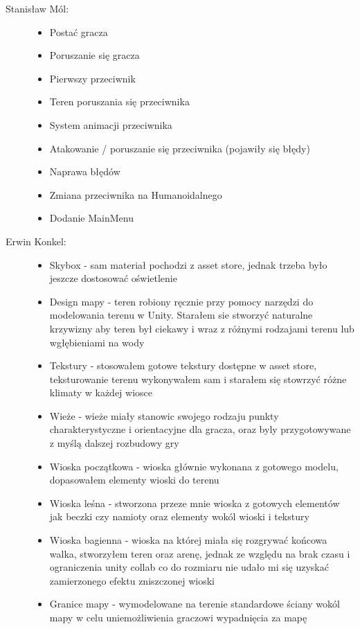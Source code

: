 \documentclass[10pt,a4paper]{article}
\begin{document}
\vspace{0.5cm}
\begin{description}
  \item[Stanisław Mól:] \hfill
  	\begin{itemize}
 	  \item Postać gracza
 	  \item Poruszanie się gracza
	  \item Pierwszy przeciwnik
	  \item Teren poruszania się przeciwnika
	  \item System animacji przeciwnika
	  \item Atakowanie / poruszanie się przeciwnika (pojawiły się błędy)
	  \item Naprawa błędów
	  \item Zmiana przeciwnika na Humanoidalnego
	  \item Dodanie MainMenu
	\end{itemize}
  \item[ Erwin Konkel:] \hfill
  	\begin{itemize}
      \item Skybox - sam materiał pochodzi z asset store, jednak trzeba było jeszcze dostosować oświetlenie
  	  \item Design mapy - teren robiony ręcznie przy pomocy narzędzi do modelowania terenu w Unity. Starałem sie stworzyć naturalne krzywizny aby teren był ciekawy i wraz z różnymi rodzajami terenu lub wgłębieniami na wody
 	  \item Tekstury - stosowałem gotowe tekstury dostępne w asset store, teksturowanie terenu wykonywałem sam i starałem się stowrzyć różne klimaty w każdej wiosce
  	  \item Wieże - wieże miały stanowic swojego rodzaju punkty charakterystyczne i orientacyjne dla gracza, oraz byly przygotowywane z myślą dalszej rozbudowy gry
	  \item Wioska początkowa - wioska głównie wykonana z gotowego modelu, dopasowałem elementy wioski do terenu
	  \item Wioska leśna - stworzona przeze mnie wioska z gotowych elementów jak beczki czy namioty oraz elementy wokól wioski i tekstury
	  \item Wioska bagienna - wioska na której miała się rozgrywać końcowa walka, stworzyłem teren oraz arenę, jednak ze względu na brak czasu i ograniczenia unity collab co do rozmiaru nie udało mi się uzyskać zamierzonego efektu zniszczonej wioski
 	  \item Granice mapy - wymodelowane na terenie standardowe ściany wokól mapy w celu uniemożliwienia graczowi wypadnięcia za mapę

\end{itemize}
\end{description}
\end{document}
